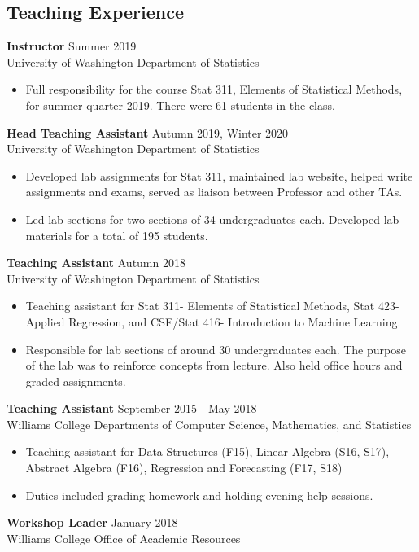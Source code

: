 \documentclass[margin, 10pt]{res} %
\begin{document}
\begin{resume}
{\section{Teaching Experience}
{\textbf{Instructor}} \hfill Summer 2019 \\
University of Washington Department of Statistics
\begin{itemize}
\item Full responsibility for the course Stat 311, Elements of Statistical Methods, for summer quarter 2019.
There were 61 students in the class. 
\end{itemize}
{\textbf{Head Teaching Assistant}} \hfill Autumn 2019, Winter 2020 \\
University of Washington Department of Statistics
\begin{itemize}
\item Developed lab assignments for Stat 311, maintained lab website, helped write assignments and exams, served as liaison between Professor and other TAs.  
\item Led lab sections for two sections of 34 undergraduates each. Developed lab materials for a total of 195 students. 
\end{itemize} 
{\textbf{Teaching Assistant}} \hfill Autumn 2018 \\
University of Washington Department of Statistics
\begin{itemize}
\item Teaching assistant for Stat 311- Elements of Statistical Methods, Stat 423- Applied Regression, and CSE/Stat 416- Introduction to Machine Learning. 
\item Responsible for lab sections of around 30 undergraduates each. The purpose of the lab was to reinforce concepts from lecture. Also held office hours and graded assignments.
\end{itemize}
{\textbf{Teaching Assistant}} \hfill September 2015 - May 2018 \\
Williams College Departments of Computer Science, Mathematics, and Statistics
\begin{itemize}
\item Teaching assistant for Data Structures (F15), Linear Algebra (S16, S17), Abstract Algebra (F16), Regression and Forecasting (F17, S18)
\item Duties included grading homework and holding evening help sessions. 
\end{itemize}
{\textbf{Workshop Leader}} \hfill January 2018 \\
Williams College Office of Academic Resources
}
\end{resume}
\end{document}
